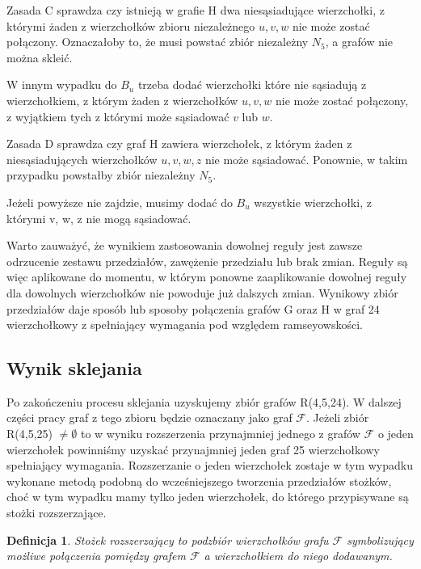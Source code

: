 \documentclass[11pt]{article}
\newtheorem{definition}{Definicja}[section]
\begin{document}
Zasada C sprawdza czy istnieją w grafie H dwa niesąsiadujące wierzchołki, z którymi żaden z wierzchołków zbioru niezależnego $u, v, w$ nie może zostać połączony. 
Oznaczałoby to, że musi powstać zbiór niezależny $N_5$, a grafów nie można skleić.


W innym wypadku do $B_u$ trzeba dodać wierzchołki które nie sąsiadują z wierzchołkiem, 
z którym żaden z wierzchołków $u, v, w$ nie może zostać połączony, z wyjątkiem tych z którymi może sąsiadować $v$ lub $w$.  \par

Zasada D sprawdza czy graf H zawiera wierzchołek, z którym żaden z niesąsiadujących wierzchołków $u, v, w, z$
nie może sąsiadować. Ponownie, w takim przypadku powstałby zbiór niezależny $N_5$.

Jeżeli powyższe nie zajdzie, musimy dodać do $B_u$ wszystkie wierzchołki, z którymi v, w, z nie mogą sąsiadować. \par


Warto zauważyć, że wynikiem zastosowania dowolnej reguły jest zawsze odrzucenie zestawu przedziałów, zawężenie przedziału lub brak zmian. Reguły są więc aplikowane do momentu, w którym ponowne zaaplikowanie dowolnej reguły dla dowolnych wierzchołków nie powoduje już dalszych zmian. Wynikowy zbiór przedziałów daje sposób lub sposoby połączenia grafów G oraz H w graf 24 wierzchołkowy z spełniający wymagania pod względem ramseyowskości.

\subsection{Wynik sklejania}

Po zakończeniu procesu sklejania uzyskujemy zbiór grafów R(4,5,24). W dalszej części pracy graf z tego zbioru będzie oznaczany jako graf $\mathcal{F}$. Jeżeli zbiór R(4,5,25) $\neq \emptyset$ to w wyniku rozszerzenia przynajmniej jednego z grafów $\mathcal{F}$ o jeden wierzchołek powinniśmy uzyskać przynajmniej jeden graf 25 wierzchołkowy spełniający wymagania. 
Rozszerzanie o jeden wierzchołek zostaje w tym wypadku wykonane metodą podobną do wcześniejszego tworzenia przedziałów stożków, choć w tym wypadku mamy tylko jeden wierzchołek, do którego przypisywane są stożki rozszerzające.
\begin{definition} Stożek rozszerzający to podzbiór wierzchołków grafu $\mathcal{F}$ symbolizujący możliwe połączenia pomiędzy grafem $\mathcal{F}$ a wierzchołkiem do niego dodawanym.
\end{definition}
\end{document}
